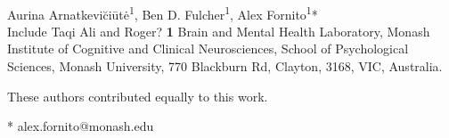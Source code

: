 \documentclass[10pt,letterpaper]{article}
\date{}
\begin{document}
\vspace*{0.2in}

\begin{flushleft}
{\Large
\textbf{} %
}
\newline
\\
Aurina Arnatkevi\u{c}i\={u}t\.{e}\textsuperscript{1\Yinyang},
Ben D. Fulcher\textsuperscript{1\Yinyang},
Alex Fornito\textsuperscript{1}*\\
Include Taqi Ali and Roger?
\bigskip
\textbf{1} Brain and Mental Health Laboratory, Monash Institute of Cognitive and Clinical Neurosciences, School of Psychological Sciences, Monash University, 770 Blackburn Rd, Clayton, 3168, VIC, Australia.
\\
\bigskip

%
%
\Yinyang These authors contributed equally to this work.





* alex.fornito@monash.edu

\end{flushleft}
\end{document}
